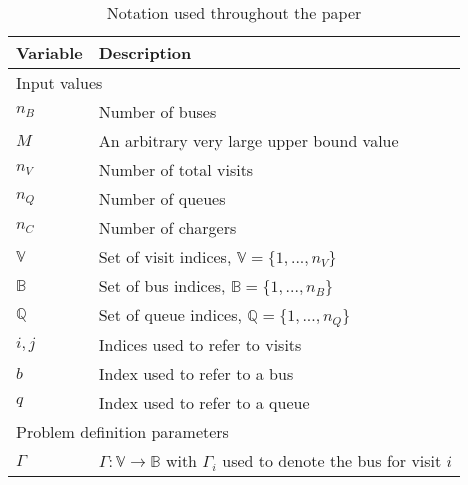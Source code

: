 \documentclass[11pt,a4paper,final]{article}
\begin{document}
\begin{table}[!htpb]
  \caption{Notation used throughout the paper}
  \label{tab:variables}
  \centering
  \begin{tabularx}{\textwidth}{l l}
    \toprule
    \textbf{Variable} & \textbf{Description}                                                                               \\
    \toprule
    \multicolumn{2}{l}{Input values}                                                                                       \\
    $n_B$        & Number of buses                                                                                         \\
    $M$          & An arbitrary very large upper bound value                                                               \\
    $n_V$        & Number of total visits                                                                                  \\
    $n_Q$        & Number of queues                                                                                        \\
    $n_C$ 	 & Number of chargers                                                                                      \\
    $\mathbb{V}$ & Set of visit indices, $\mathbb{V} = \{1, ..., n_V\}$                                                    \\
    $\mathbb{B}$ & Set of bus indices, $\mathbb{B} = \{1, ..., n_B\}$                                                      \\
    $\mathbb{Q}$          & Set of queue indices, $\mathbb{Q} = \{1, ..., n_Q\}$                                                             \\
    $i,j$        & Indices used to refer to visits                                                                         \\
    $b$ 	 & Index used to refer to a bus                                                                            \\
    $q$ 	 & Index used to refer to a queue                                                                          \\
    \hline
    \multicolumn{2}{l}{Problem definition parameters}                                                                      \\
    $\Gamma$   & $\Gamma: \mathbb{V} \rightarrow \mathbb{B}$ with $\Gamma_i$ used to denote the bus for visit $i$                                   \\

\end{tabularx}
\end{table}
\end{document}
